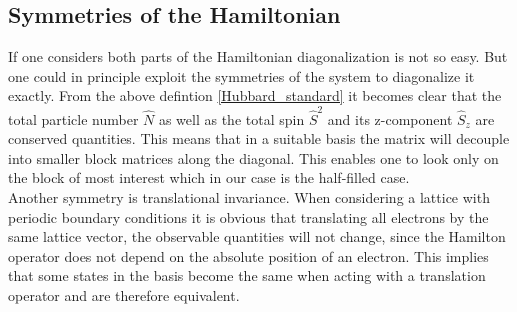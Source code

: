 
\subsection{Symmetries of the Hamiltonian}
If one considers both parts of the Hamiltonian diagonalization is not so easy. But one could in principle exploit the symmetries of the system to diagonalize it exactly. From the above defintion \eqref{Hubbard_standard} it becomes clear that the total particle number $ \hat{N} $ as well as the total spin $ \hat{S}^2 $ and its z-component $ \hat{S}_z $ are conserved quantities. This means that in a suitable basis the matrix will decouple into smaller block matrices along the diagonal. This enables one to look only on the block of most interest which in our case is the half-filled case. \\


Another symmetry is translational invariance. When considering a lattice with periodic boundary conditions it is obvious that translating all electrons by the same lattice vector, the observable quantities will not change, since the Hamilton operator does not depend on the absolute position of an electron. This implies that some states in the basis become the same when acting with a translation operator and are therefore equivalent.\\


